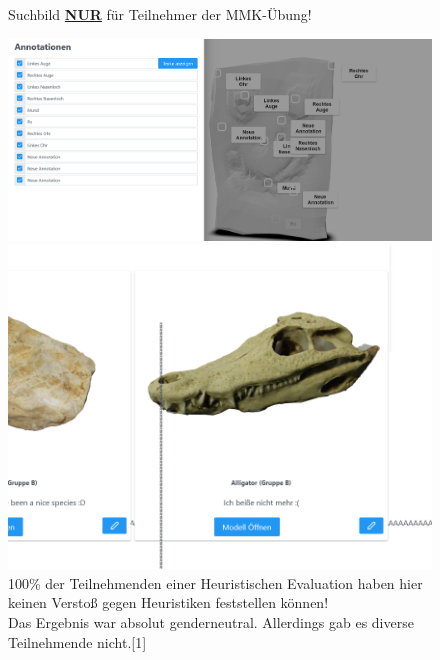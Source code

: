 \documentclass[12pt, aspectratio=169]{beamer}
\begin{document}
\begin{frame}
\begin{figure}
	Suchbild \underline{\textbf{NUR}} für Teilnehmer der MMK-Übung!
	\begin{minipage}[b]{0.45\linewidth}
		\centering
		\includegraphics[width=\textwidth]{image/Heur2.png}
	\end{minipage}
	\hspace{0.5cm}
	\begin{minipage}[b]{0.45\linewidth}
		\centering
		\includegraphics[width=\textwidth]{image/Heur1.png}
	\end{minipage}
	\caption{100\% der Teilnehmenden einer Heuristischen Evaluation haben hier keinen Verstoß gegen Heuristiken feststellen können!
	\ \\ Das Ergebnis war absolut genderneutral. Allerdings gab es diverse Teilnehmende nicht.\tiny{[1]}}
\end{figure}

\end{frame}
\end{document}
